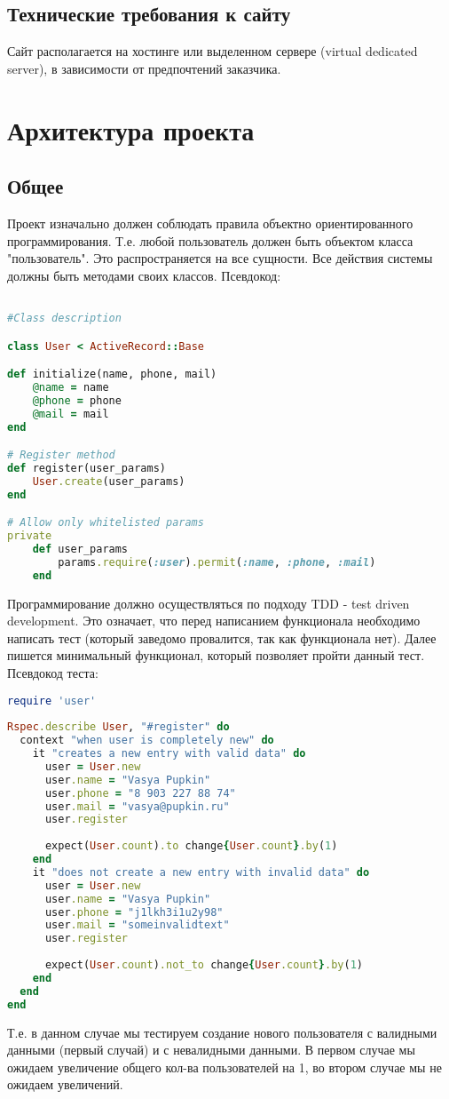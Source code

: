 \documentclass[DIV=calc, paper=a4, fontsize=11pt]{scrartcl} %
\begin{document}
\subsection{Технические требования к сайту}
Сайт располагается на хостинге или выделенном сервере (virtual dedicated server), в зависимости от предпочтений заказчика.



\section{Архитектура проекта}

\subsection{Общее}

Проект изначально должен соблюдать правила объектно ориентированного программирования. Т.е. любой пользователь должен быть объектом класса "пользователь". Это распространяется на все сущности. Все действия системы должны быть методами своих классов. Псевдокод:
\begin{lstlisting}[language=Ruby]

#Class description

class User < ActiveRecord::Base 

def initialize(name, phone, mail)
	@name = name
	@phone = phone
	@mail = mail
end

# Register method
def register(user_params)
	User.create(user_params)
end

# Allow only whitelisted params
private
	def user_params
		params.require(:user).permit(:name, :phone, :mail)
	end
\end{lstlisting}

Программирование должно осуществляться по подходу TDD - test driven development. Это означает, что перед написанием функционала необходимо написать тест (который заведомо провалится, так как функционала нет). Далее пишется минимальный функционал, который позволяет пройти данный тест.
\\[0.5cm]
Псевдокод теста:
\begin{lstlisting}[language=Ruby]
require 'user'
	
Rspec.describe User, "#register" do
  context "when user is completely new" do
	it "creates a new entry with valid data" do
	  user = User.new
      user.name = "Vasya Pupkin"
	  user.phone = "8 903 227 88 74"
	  user.mail = "vasya@pupkin.ru"
	  user.register
				
	  expect(User.count).to change{User.count}.by(1)
	end
    it "does not create a new entry with invalid data" do
      user = User.new
	  user.name = "Vasya Pupkin"
	  user.phone = "j1lkh3i1u2y98"
	  user.mail = "someinvalidtext"
	  user.register	
		
      expect(User.count).not_to change{User.count}.by(1)
	end
  end
end
\end{lstlisting}
Т.е. в данном случае мы тестируем создание нового пользователя с валидными данными (первый случай) и с невалидными данными. В первом случае мы ожидаем увеличение общего кол-ва пользователей на 1, во втором случае мы не ожидаем увеличений.
\end{document}
